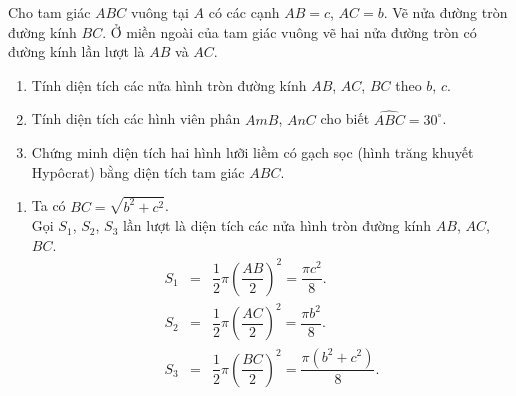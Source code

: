 \begin{bt}%
	Cho tam giác $ABC$ vuông tại $A$ có các cạnh $AB=c$, $AC=b$. Vẽ nửa đường tròn đường kính $BC$. Ở miền ngoài của tam giác vuông vẽ hai nửa đường tròn có đường kính lần lượt là $AB$ và $AC$.
	\begin{center}
	\end{center}
	\begin{enumerate}
		\item Tính diện tích các nửa hình tròn đường kính $AB$, $AC$, $BC$ theo $b$, $c$.
		\item Tính diện tích các hình viên phân $AmB$, $AnC$ cho biết $\widehat{ABC}=30^\circ$.
		\item Chứng minh diện tích hai hình lưỡi liềm có gạch sọc (hình trăng khuyết Hypôcrat) bằng diện tích tam giác $ABC$.
	\end{enumerate}
	\loigiai
	{
		\begin{enumerate}
			\item Ta có $BC = \sqrt{b^2+c^2}$.\\
			Gọi $S_1$, $S_2$, $S_3$ lần lượt là diện tích các nửa hình tròn đường kính $AB$, $AC$, $BC$.
			\allowdisplaybreaks
			\begin{eqnarray*}
				S_1 &=& \dfrac{1}{2}\pi\left(\dfrac{AB}{2}\right)^2 = \dfrac{\pi c^2}{8}.\\
				S_2 &=& \dfrac{1}{2}\pi\left(\dfrac{AC}{2}\right)^2 = \dfrac{\pi b^2}{8}.\\
				S_3 &=& \dfrac{1}{2}\pi\left(\dfrac{BC}{2}\right)^2 = \dfrac{\pi(b^2+c^2)}{8}.
			\end{eqnarray*}

\end{enumerate}}
\end{bt}
